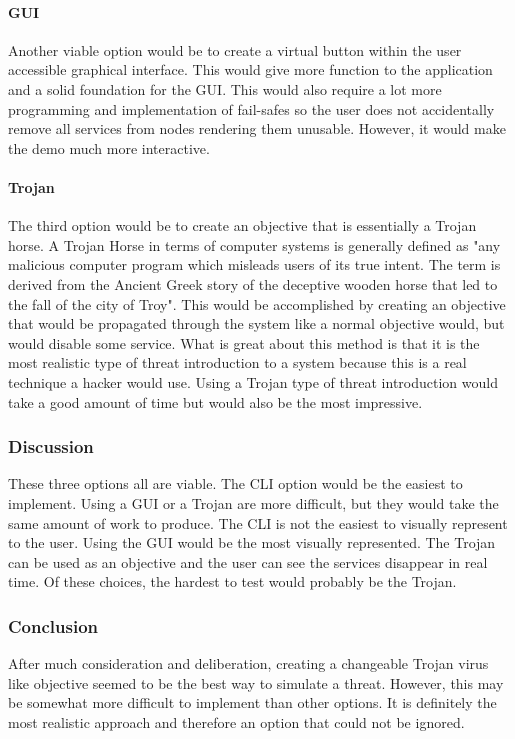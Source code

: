 \paragraph{GUI}
Another viable option would be to create a virtual button within the user accessible graphical interface. This would give more function to the application and a solid foundation for the GUI. This would also require a lot more programming and implementation of fail-safes so the user does not accidentally remove all services from nodes rendering them unusable. However, it would make the demo much more interactive.
\paragraph{Trojan}
The third option would be to create an objective that is essentially a Trojan horse. A Trojan Horse in terms of computer systems is generally defined as "any malicious computer program which misleads users of its true intent. The term is derived from the Ancient Greek story of the deceptive wooden horse that led to the fall of the city of Troy"\cite{Trojan}. This would be accomplished by creating an objective that would be propagated through the system like a normal objective would, but would disable some service. What is great about this method is that it is the most realistic type of threat introduction to a system because this is a real technique a hacker would use. Using a Trojan type of threat introduction would take a good amount of time but would also be the most impressive.
\subsubsection{Discussion}
These three options all are viable. The CLI option would be the easiest to implement. Using a GUI or a Trojan are more difficult, but they would take the same amount of work to produce. The CLI is not the easiest to visually represent to the user. Using the GUI would be the most visually represented. The Trojan can be used as an objective and the user can see the services disappear in real time. Of these choices, the hardest to test would probably be the Trojan.
\subsubsection{Conclusion}
After much consideration and deliberation, creating a changeable Trojan virus like objective seemed to be the best way to simulate a threat. However, this may be somewhat more difficult to implement than other options. It is definitely the most realistic approach and therefore an option that could not be ignored.

